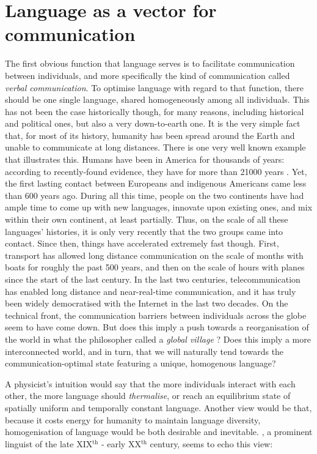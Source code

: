 \documentclass[../thesis.tex]{subfiles}
\begin{document}
\section{Language as a vector for communication}
The first obvious function that language serves is to facilitate communication between
individuals, and more specifically the kind of communication called \emph{verbal
communication}. To optimise language with regard to that function, there should be one
single language, shared homogeneously among all individuals. This has not been the case
historically though, for many reasons, including historical and political ones, but also
a very down-to-earth one. It is the very simple fact that, for most of its history,
humanity has been spread around the Earth and unable to communicate at long distances.
There is one very well known example that illustrates this. Humans have been in America
for thousands of years: according to recently-found evidence, they have for more than
\SI{21000}{} years \cite{BennettEvidenceHumans2021}. Yet, the first lasting contact
between Europeans and indigenous Americans came less than 600 years ago. During all this
time, people on the two continents have had ample time to come up with new languages,
innovate upon existing ones, and mix within their own continent, at least partially.
Thus, on the scale of all these languages' histories, it is only very recently that the
two groups came into contact. Since then, things have accelerated extremely fast though.
First, transport has allowed long distance communication on the scale of months with
boats for roughly the past 500 years, and then on the scale of hours with planes since
the start of the last century. In the last two centuries, telecommunication has enabled
long distance and near-real-time communication, and it has truly been widely
democratised with the Internet in the last two decades. On the technical front, the
communication barriers between individuals across the globe seem to have come down. But
does this imply a push towards a reorganisation of the world in what the philosopher
 called a \emph{global village}
\cite{McLuhanGutenbergGalaxy2008}? Does this imply a more interconnected world, and in
turn, that we will naturally tend towards the communication-optimal state featuring a
unique, homogenous language?


A physicist's intuition would say that the more individuals interact with each other,
the more language should \emph{thermalise}, or reach an equilibrium state of spatially
uniform and temporally constant language. Another view would be that, because it costs
energy for humanity to maintain language diversity, homogenisation of language would be
both desirable and inevitable.
, a prominent linguist of the
late XIX$^\text{th}$ - early XX$^\text{th}$ century, seems to echo this view:
\end{document}
